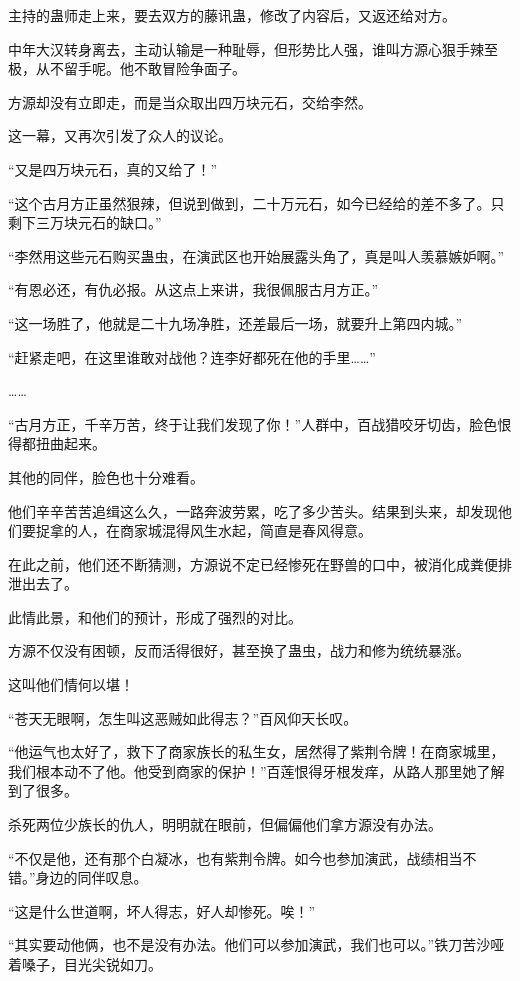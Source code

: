 \begin{this_body}
主持的蛊师走上来，要去双方的藤讯蛊，修改了内容后，又返还给对方。

中年大汉转身离去，主动认输是一种耻辱，但形势比人强，谁叫方源心狠手辣至极，从不留手呢。他不敢冒险争面子。

方源却没有立即走，而是当众取出四万块元石，交给李然。

这一幕，又再次引发了众人的议论。

“又是四万块元石，真的又给了！”

“这个古月方正虽然狠辣，但说到做到，二十万元石，如今已经给的差不多了。只剩下三万块元石的缺口。”

“李然用这些元石购买蛊虫，在演武区也开始展露头角了，真是叫人羡慕嫉妒啊。”

“有恩必还，有仇必报。从这点上来讲，我很佩服古月方正。”

“这一场胜了，他就是二十九场净胜，还差最后一场，就要升上第四内城。”

“赶紧走吧，在这里谁敢对战他？连李好都死在他的手里……”

……

“古月方正，千辛万苦，终于让我们发现了你！”人群中，百战猎咬牙切齿，脸色恨得都扭曲起来。

其他的同伴，脸色也十分难看。

他们辛辛苦苦追缉这么久，一路奔波劳累，吃了多少苦头。结果到头来，却发现他们要捉拿的人，在商家城混得风生水起，简直是春风得意。

在此之前，他们还不断猜测，方源说不定已经惨死在野兽的口中，被消化成粪便排泄出去了。

此情此景，和他们的预计，形成了强烈的对比。

方源不仅没有困顿，反而活得很好，甚至换了蛊虫，战力和修为统统暴涨。

这叫他们情何以堪！

“苍天无眼啊，怎生叫这恶贼如此得志？”百风仰天长叹。

“他运气也太好了，救下了商家族长的私生女，居然得了紫荆令牌！在商家城里，我们根本动不了他。他受到商家的保护！”百莲恨得牙根发痒，从路人那里她了解到了很多。

杀死两位少族长的仇人，明明就在眼前，但偏偏他们拿方源没有办法。

“不仅是他，还有那个白凝冰，也有紫荆令牌。如今也参加演武，战绩相当不错。”身边的同伴叹息。

“这是什么世道啊，坏人得志，好人却惨死。唉！”

“其实要动他俩，也不是没有办法。他们可以参加演武，我们也可以。”铁刀苦沙哑着嗓子，目光尖锐如刀。


\end{this_body}
